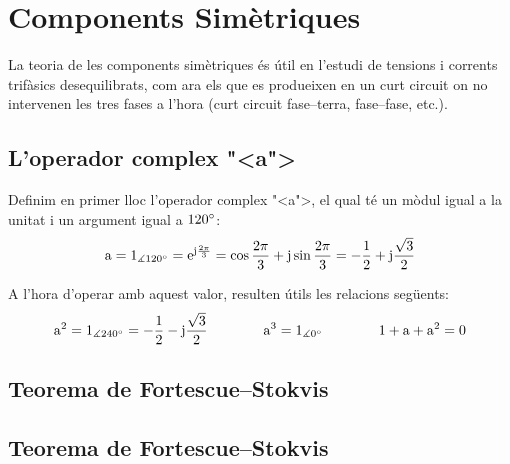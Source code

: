 \chapter{Components Sim\`{e}triques} 

La teoria de les components sim\`{e}triques \'{e}s \'{u}til en l'estudi de
tensions i corrents trif\`{a}sics
 desequilibrats, com ara els que es produeixen en un curt circuit on no intervenen les tres
 fases a l'hora (curt circuit fase--terra, fase--fase, etc.).

\section{L'operador complex {"<}a{">}}

Definim en primer lloc l'operador complex {"<}a{">}, el qual t\'{e} un m\`{o}dul
igual a la unitat i un argument igual a $120^\circ$: 
\begin{equation}
   \mathrm{a} = 1_{\measuredangle 120^\circ} = \mathrm{e}^{\mathrm{j}\frac{2\pi}{3}} =
   \cos \frac{2\pi}{3} + \mathrm{j} \sin \frac{2\pi}{3} = - \frac{1}{2} + \mathrm{j} \frac{\sqrt{3}}{2}
\end{equation}

A l'hora d'operar amb aquest valor, resulten \'{u}tils les relacions
seg\"{u}ents:
\begin{equation}
   \mathrm{a}^2 = 1_{\measuredangle 240^\circ}= - \frac{1}{2} - \mathrm{j} \frac{\sqrt{3}}{2}\qquad\qquad
   \mathrm{a}^3 = 1_{\measuredangle 0^\circ} \qquad\qquad
   1+ \mathrm{a} + \mathrm{a}^2 = 0
\end{equation}

\ifpdf
    \section{\texorpdfstring{Teorema de Fortescue--Stokvis}{Teorema de Fortescue-Stokvis}}
\else
    \section{Teorema de Fortescue--Stokvis}
\fi {}

